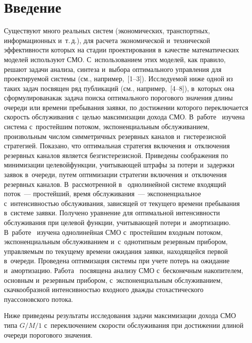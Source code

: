 \begin{multicols}{2}

\label{st\stat}
  
  
\section{Введение}

  Существуют много реальных сис\-тем (экономических, транспортных, 
информационных и~т.\,д.), для расчета экономической и~технической 
эффективности которых на стадии проектирования в~качестве математических 
моделей используют СМО. 
С~использованием этих моделей, как правило, решают задачи анализа, синтеза 
и~выбора оптимального управления для проектируемой сис\-те\-мы (см., 
например,~[1--3]). Исследуемой ниже одной из таких задач посвящен ряд 
публикаций (см., например,~[4--8]), в~которых она сформулирована\linebreak как задача 
поиска оптимального порогового значения длины очереди или времени 
пребывания заявки, по достижении которого переключается скорость 
обслуживания с~целью максимизации \mbox{дохода} СМО. В~работе~\cite{4-aga} 
изучена сис\-те\-ма с~простейшим потоком, экспоненциальным обслуживанием, 
произвольным числом симметричных резервных каналов и~гистерезисной 
стратегией. \mbox{Показано}, что оптимальная стратегия включения и~отключения 
резервных каналов является безгистерезисной. Приведены соображения по 
минимизации целевой\linebreak функции, учитывающей штрафы за потери и~задержки 
заявок в~очереди, путем оптимизации стратегии включения и~отключения 
резервных каналов. В~рассмотренной в~\cite{5-aga} однолинейной \mbox{сис\-те\-ме} 
входящий поток~--- простейший, время обслуживания~--- экспоненциальное 
с~ин\-тен\-сив\-ностью обслуживания, зависящей от текущего времени пребывания 
в~сис\-те\-ме заявки. Получено уравнение для оптимальной интенсивности 
обслуживания при целевой функции, учитывающей потери и~амортизацию. 
В~работе~\cite{6-aga} изучена однолинейная СМО с~простейшим входным 
потоком, экспоненциальным обслуживанием и~с~однотипным резервным 
прибором, управляемым по текущему времени ожидания заявки, находящейся 
первой в~очереди. Проведена оптимизация сис\-те\-мы при учете потерь на 
ожидание и~амортизацию. Работа~\cite{7-aga} посвящена анализу СМО 
с~бесконечным накопителем, основным и~резервным прибором, 
с~экспоненциальным обслуживанием, скачкообразной интенсивностью 
входного дважды стохастического пуассоновского потока. 
  
  Ниже приведены результаты исследования задачи максимизации дохода 
СМО типа $G/M/1$ с~переключением скорости обслуживания при достижении 
длиной очереди порогового значения.


\end{multicols}
